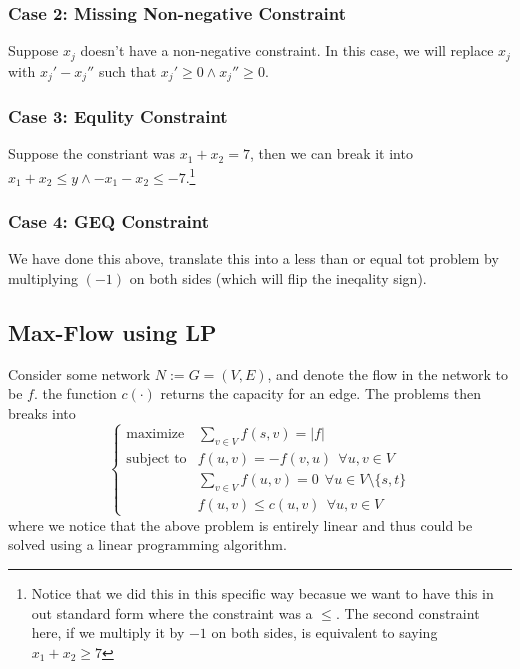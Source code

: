 \documentclass[10pt]{article}
\begin{document}
\subsubsection{Case 2: Missing Non-negative Constraint} Suppose $x_j$ doesn't have a non-negative constraint. In this case, we will replace $x_j$ with $x_j' - x_j''$ such that $x_j' \geq 0\land x_j'' \geq 0$. 
\subsubsection{Case 3: Equlity Constraint} Suppose the constriant was $x_1 + x_2 = 7$, then we can break it into $x_1 + x_2 \leq y \land -x_1 - x_2 \leq -7$.\footnote{Notice that we did this in this specific way becasue we want to have this in out standard form where the constraint was a $\leq$. The second constraint here, if we multiply it by $-1$ on both sides, is equivalent to saying $x_1+x_2 \geq 7$}
\subsubsection{Case 4: GEQ Constraint} We have done this above, translate this into a less than or equal tot problem by multiplying $(-1)$ on both sides (which will flip the ineqality sign).

\subsection{Max-Flow using LP}
Consider some network $N:= G = (V,E)$, and denote the flow in the network to be $f$. the function $c(\cdot)$ returns the capacity for an edge. The problems then breaks into
$$
\begin{cases}
    \text{maximize} &\sum_{v\in V} f(s,v) = |f| \\
    \text{subject to} &f(u,v) = -f(v,u)~~\forall u, v \in V \\
    &\sum_{v\in V}f(u,v) = 0 ~~\forall u \in V\setminus\{s, t\} \\
    &f(u,v) \leq c(u,v) ~~\forall u,v \in V
\end{cases}
$$
where we notice that the above problem is entirely linear and thus could be solved using a linear programming algorithm.
\end{document}
